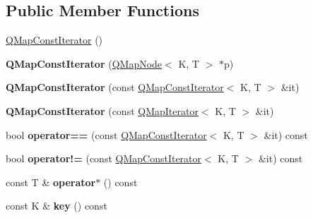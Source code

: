 \subsection*{Public Member Functions}
\begin{DoxyCompactItemize}
\item 
\mbox{\hyperlink{class_q_map_const_iterator_a86b9986fefaa47f9991d997993074309}{Q\+Map\+Const\+Iterator}} ()
\item 
\mbox{\label{class_q_map_const_iterator_a7e14b5e794324934f2764ac6677384c4}} 
{\bfseries Q\+Map\+Const\+Iterator} (\mbox{\hyperlink{struct_q_map_node}{Q\+Map\+Node}}$<$ K, T $>$ $\ast$p)
\item 
\mbox{\label{class_q_map_const_iterator_a2c335bfdb9ac4b7e0f18d268c2f5b47c}} 
{\bfseries Q\+Map\+Const\+Iterator} (const \mbox{\hyperlink{class_q_map_const_iterator}{Q\+Map\+Const\+Iterator}}$<$ K, T $>$ \&it)
\item 
\mbox{\label{class_q_map_const_iterator_a9b3a6f2a8a27f95e40b84741c3e276b0}} 
{\bfseries Q\+Map\+Const\+Iterator} (const \mbox{\hyperlink{class_q_map_iterator}{Q\+Map\+Iterator}}$<$ K, T $>$ \&it)
\item 
\mbox{\label{class_q_map_const_iterator_a03a61baa7abfcaab9f0f494315d90db4}} 
bool {\bfseries operator==} (const \mbox{\hyperlink{class_q_map_const_iterator}{Q\+Map\+Const\+Iterator}}$<$ K, T $>$ \&it) const
\item 
\mbox{\label{class_q_map_const_iterator_a3c4620cce5a4b97f60c83f05bdde7487}} 
bool {\bfseries operator!=} (const \mbox{\hyperlink{class_q_map_const_iterator}{Q\+Map\+Const\+Iterator}}$<$ K, T $>$ \&it) const
\item 
\mbox{\label{class_q_map_const_iterator_a2260d18487ffee5d85e9b1687e6299b8}} 
const T \& {\bfseries operator$\ast$} () const
\item 
\mbox{\label{class_q_map_const_iterator_a6b12f967b7a26cd58e4e8a5a5fb19a93}} 
const K \& {\bfseries key} () const
\item 
\mbox{\label{class_q_map_const_iterator_a50b890752daacfc0c8cf7c16ca837ae0}} 

\end{DoxyCompactItemize}
